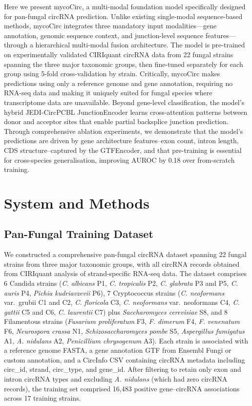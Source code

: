\documentclass[12pt]{article}
\begin{document}
Here we present mycoCirc, a multi-modal foundation model specifically designed for pan-fungal circRNA prediction. Unlike existing single-modal sequence-based methods, mycoCirc integrates three mandatory input modalities---gene annotation, genomic sequence context, and junction-level sequence features---through a hierarchical multi-modal fusion architecture. The model is pre-trained on experimentally validated CIRIquant \cite{zhang2020ciriquant} circRNA data from 22 fungal strains spanning the three major taxonomic groups, then fine-tuned separately for each group using 5-fold cross-validation by strain. Critically, mycoCirc makes predictions using only a reference genome and gene annotation, requiring no RNA-seq data and making it uniquely suited for fungal species where transcriptome data are unavailable. Beyond gene-level classification, the model's hybrid JEDI-CircPCBL JunctionEncoder learns cross-attention patterns between donor and acceptor sites that enable partial backsplice junction prediction. Through comprehensive ablation experiments, we demonstrate that the model's predictions are driven by gene architecture features--exon count, intron length, CDS structure--captured by the GTFEncoder, and that pre-training is essential for cross-species generalisation, improving AUROC by 0.18 over from-scratch training.

\section{System and Methods}

\subsection{Pan-Fungal Training Dataset}

We constructed a comprehensive pan-fungal circRNA dataset spanning 22 fungal strains from three major taxonomic groups, with all circRNA records obtained from CIRIquant analysis of strand-specific RNA-seq data. The dataset comprises 6 Candida strains (\textit{C. albicans} P1, \textit{C. tropicalis} P2, \textit{C. glabrata} P3 and P5, \textit{C. auris} P4, \textit{Pichia kudriavzevii} P6), 7 Cryptococcus strains (\textit{C. neoformans} var.\ grubii C1 and C2, \textit{C. floricola} C3, \textit{C. neoformans} var.\ neoformans C4, \textit{C. gattii} C5 and C6, \textit{C. laurentii} C7) plus \textit{Saccharomyces cerevisiae} S8, and 8 Filamentous strains (\textit{Fusarium proliferatum} F3, \textit{F. dimerum} F4, \textit{F. venenatum} F6, \textit{Neurospora crassa} N1, \textit{Schizosaccharomyces pombe} S5, \textit{Aspergillus fumigatus} A1, \textit{A. nidulans} A2, \textit{Penicillium chrysogenum} A3). Each strain is associated with a reference genome FASTA, a gene annotation GTF from Ensembl Fungi or custom annotation, and a CircInfo CSV containing circRNA metadata including circ\_id, strand, circ\_type, and gene\_id. After filtering to retain only exon and intron circRNA types and excluding \textit{A. nidulans} (which had zero circRNA records), the training set comprised 16,483 positive gene--circRNA associations across 17 training strains.
\end{document}
